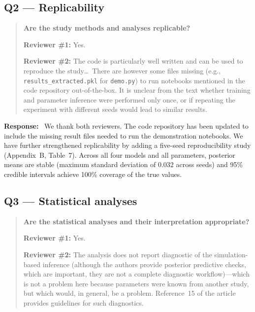 \documentclass[11pt,a4paper]{article}
\newenvironment{reviewercomment}{%
  \begin{quote}\itshape\color{reviewerblue}%
}{%
  \end{quote}%
}
\newcommand{\response}{\textbf{Response:}~}
\begin{document}
\subsection*{Q2 --- Replicability}

\begin{reviewercomment}
\textbf{Are the study methods and analyses replicable?}

\textbf{Reviewer \#1:} Yes.

\textbf{Reviewer \#2:} The code is particularly well written and can be used to reproduce the study\ldots\ There are however some files missing (e.g., \texttt{results\_extracted.pkl} for \texttt{demo.py}) to run notebooks mentioned in the code repository out-of-the-box. It is unclear from the text whether training and parameter inference were performed only once, or if repeating the experiment with different seeds would lead to similar results.
\end{reviewercomment}

\response
We thank both reviewers. The code repository has been updated to include the missing result files needed to run the demonstration notebooks. We have further strengthened replicability by adding a five-seed reproducibility study (Appendix~B, Table~7). Across all four models and all parameters, posterior means are stable (maximum standard deviation of 0.032 across seeds) and 95\% credible intervals achieve 100\% coverage of the true values.


\subsection*{Q3 --- Statistical analyses}

\begin{reviewercomment}
\textbf{Are the statistical analyses and their interpretation appropriate?}

\textbf{Reviewer \#1:} Yes.

\textbf{Reviewer \#2:} The analysis does not report diagnostic of the simulation-based inference (although the authors provide posterior predictive checks, which are important, they are not a complete diagnostic workflow)---which is not a problem here because parameters were known from another study, but which would, in general, be a problem. Reference~15 of the article provides guidelines for such diagnostics.
\end{reviewercomment}
\end{document}

